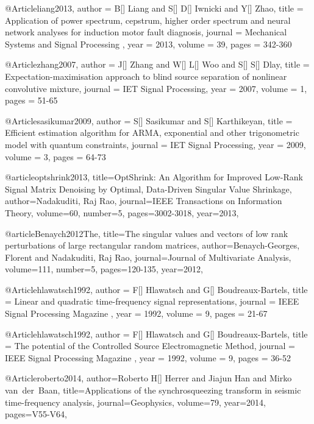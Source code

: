 @Article{liang2013,
  author = 	 {B[] Liang and S[] D[] Iwnicki and Y[] Zhao},
  title = 	 {Application of power spectrum, cepstrum, higher order spectrum and neural network analyses for induction motor fault diagnosis},
  journal = 	 {Mechanical Systems and Signal Processing },
  year = 	 2013,
  volume = 39,
  pages = 	 {342-360}
}

@Article{zhang2007,
  author = 	 {J[] Zhang and W[] L[] Woo and S[] S[] Dlay},
  title = 	 {Expectation-maximisation approach to blind source separation of nonlinear convolutive mixture},
  journal = 	 {IET Signal Processing},
  year = 	 2007,
  volume = 1,
  pages = 	 {51-65}
}

@Article{sasikumar2009,
  author = 	 {S[] Sasikumar and S[] Karthikeyan},
  title = 	 {Efficient estimation algorithm for ARMA, exponential and other trigonometric model with quantum constraints},
  journal = 	 {IET Signal Processing},
  year = 	 2009,
  volume = 3,
  pages = 	 {64-73}
}






@article{optshrink2013,
  title={OptShrink: An Algorithm for Improved Low-Rank Signal Matrix Denoising by Optimal, Data-Driven Singular Value Shrinkage},
  author={Nadakuditi, Raj Rao},
  journal={IEEE Transactions on Information Theory},
  volume={60},
  number={5},
  pages={3002-3018},
  year={2013},
}

@article{Benaych2012The,
  title={The singular values and vectors of low rank perturbations of large rectangular random matrices},
  author={Benaych-Georges, Florent and Nadakuditi, Raj Rao},
  journal={Journal of Multivariate Analysis},
  volume={111},
  number={5},
  pages={120-135},
  year={2012},
}


@Article{hlawatsch1992,
  author = 	 {F[] Hlawatsch and G[] Boudreaux-Bartels},
  title = 	 { Linear and quadratic time-frequency signal representations},
  journal = 	 { IEEE Signal Processing Magazine },
  year = 	 1992,
  volume = 	 9,
  pages = 	 {21-67}
}

@Article{hlawatsch1992,
  author = 	 {F[] Hlawatsch and G[] Boudreaux-Bartels},
  title = 	 {The potential of the Controlled Source Electromagnetic Method},
  journal = 	 { IEEE Signal Processing Magazine },
  year = 	 1992,
  volume = 	 9,
  pages = 	 {36-52}
}

@Article{roberto2014,
author={Roberto H[] Herrer and Jiajun Han and Mirko van~der~Baan},
title={Applications of the synchrosqueezing transform
in seismic time-frequency analysis},
journal={Geophysics},
volume=79,
year=2014,
pages={V55-V64},
}

